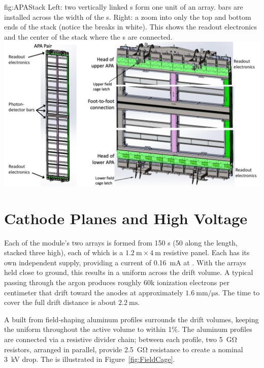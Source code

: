 \begin{dunefigure}{fig:APAStack}
{Left: two vertically linked s form one unit of an  array.  bars are installed across the width of the s. Right: a zoom into only the top and bottom ends of the  stack (notice the breaks in white). This shows the readout electronics and the center of the stack where the s are connected.}
\includegraphics[width=\textwidth]{graphics/APAStack}
\end{dunefigure}

\section{Cathode Planes and High Voltage}

Each of the module's two  arrays is formed from 150 s (50 along the length, stacked three high), each of which is a $\SI{1.2}{\meter}\times\SI{4}{\meter}$ resistive panel. Each  has its own independent  supply, providing a current of \SI{0.16}{\milli\ampere} at \sptargetdriftvolt{}. 
With the   arrays held close to ground, this results in a uniform \spmaxfield \efield across the drift volume.  A typical  passing through the argon produces roughly 60k ionization electrons per centimeter that drift toward the anodes at approximately $\SI{1.6}{\mm/\micro\second}$. The time to cover the full drift distance is about $\SI{2.2}{\milli\second}$.

A  built from field-shaping aluminum profiles surrounds the drift volumes, keeping  the \efield uniform throughout the active  volume to within 1\%.  The aluminum profiles are connected via a resistive divider chain; between each profile, two \SI{5}{\giga\ohm} resistors, arranged in parallel, provide  \SI{2.5}{\giga\ohm} resistance to create a nominal \SI{3}{\kilo\volt} drop. The  is illustrated in Figure~\ref{fig:FieldCage}.

